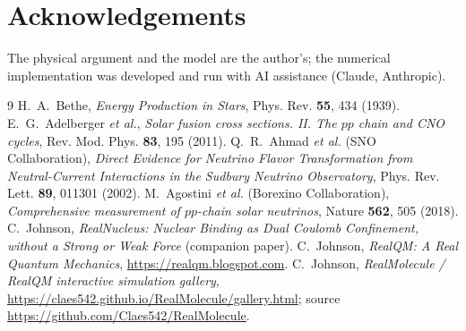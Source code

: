 \documentclass[11pt]{article}
\begin{document}
\section*{Acknowledgements}
The physical argument and the model are the author's; the numerical implementation was developed and
run with AI assistance (Claude, Anthropic).

\begin{thebibliography}{9}
 H.~A.~Bethe, \emph{Energy Production in Stars}, Phys. Rev. \textbf{55}, 434 (1939).
 E.~G.~Adelberger \emph{et al.}, \emph{Solar fusion cross sections. II. The
$pp$ chain and CNO cycles}, Rev. Mod. Phys. \textbf{83}, 195 (2011).
 Q.~R.~Ahmad \emph{et al.} (SNO Collaboration), \emph{Direct Evidence for Neutrino Flavor
Transformation from Neutral-Current Interactions in the Sudbury Neutrino Observatory}, Phys. Rev. Lett.
\textbf{89}, 011301 (2002).
 M.~Agostini \emph{et al.} (Borexino Collaboration), \emph{Comprehensive measurement
of $pp$-chain solar neutrinos}, Nature \textbf{562}, 505 (2018).
 C.~Johnson, \emph{RealNucleus: Nuclear Binding as Dual Coulomb
Confinement, without a Strong or Weak Force} (companion paper).
 C.~Johnson, \emph{RealQM: A Real Quantum Mechanics},
\url{https://realqm.blogspot.com}.
 C.~Johnson, \emph{RealMolecule / RealQM interactive simulation gallery},
\url{https://claes542.github.io/RealMolecule/gallery.html}; source
\url{https://github.com/Claes542/RealMolecule}.
\end{thebibliography}
\end{document}
